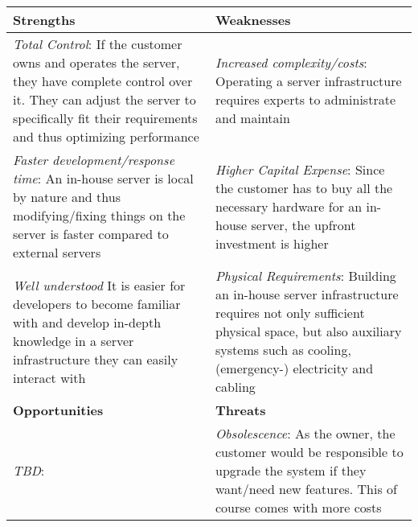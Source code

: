 \begin{center}
\begin{tabular}{ | p{0.5\linewidth} | p{0.5\linewidth} | } 
 \hline
 \textbf{Strengths} & \textbf{Weaknesses}\\ 
\hline
 \textit{Total Control}: If the customer owns and operates the server, they have complete control over it. They can adjust the server to specifically fit their requirements and thus optimizing performance & \textit{Increased complexity/costs}: Operating a server infrastructure requires experts to administrate and maintain \\ 
\textit{Faster development/response time}: An in-house server is local by nature and thus modifying/fixing things on the server is faster compared to external servers & \textit{Higher Capital Expense}: Since the customer has to buy all the necessary hardware for an in-house server, the upfront investment is higher \\
\textit{Well understood} It is easier for developers to become familiar with and develop in-depth knowledge in a server infrastructure they can easily interact with & \textit{Physical Requirements}: Building an in-house server infrastructure requires not only sufficient physical space, but also auxiliary systems such as cooling, (emergency-) electricity and cabling \\
 \hline
 \textbf{Opportunities} & \textbf{Threats}  \\ 
 \hline
\textit{TBD}: & \textit{Obsolescence}: As the owner, the customer would be responsible to upgrade the system if they want/need new features. This of course comes with more costs \\
\hline 
\end{tabular}
\end{center}